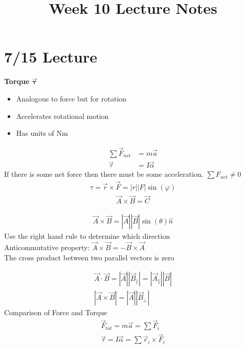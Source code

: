 \documentclass[a4paper]{article}
\date{}
\author{}
\title{Week 10 Lecture Notes}
\let\phi\varphi
\let\bf\textbf
\begin{document}
\maketitle
\section{7/15 Lecture}
\bf{Torque $\boldsymbol{\vec{\tau}}$}
\begin{itemize}
    \item Analogous to force but for rotation
    \item Accelerates rotational motion
    \item Has units of Nm
\end{itemize}
\begin{align*}
    \sum \vec{F}_{net} &= m\vec{a}\\
    \vec{\tau} &= I\vec{\alpha} 
\end{align*}
If there is some net force then there must be some acceleration. $\sum F_{net} \neq 0$
\begin{align*}
    \tau = \vec{r} \times \vec{F} = |r||F|\sin(\phi)
\end{align*}
\begin{align*}
    \vec{A} \times \vec{B} = \vec{C}
\end{align*}

\begin{align*}
    \vec{A} \times \vec{B} = |\vec{A}||\vec{B}|\sin(\theta)\hat{n}
\end{align*}
Use the right hand rule to determine which direction\\
Anticommutative property: $\vec{A} \times \vec{B} = -\vec{B} \times \vec{A}$\\
The cross product between two parallel vectors is zero

\begin{align*}
    \vec{A} \cdot \vec{B} = |\vec{A}||\vec{B}_{\parallel}| = |\vec{A}_{\parallel}||\vec{B}|\\
    |\vec{A} \times \vec{B}| = |\vec{A}||\vec{B}_{\perp}|
\end{align*}
Comparison of Force and Torque
\begin{align*}
    \vec{F}_{tot} = m\vec{a} = \sum\vec{F}_i\\
    \vec{\tau} = I\vec{\alpha} = \sum\vec{r}_i \times \vec{F}_i
\end{align*}
\end{document}
